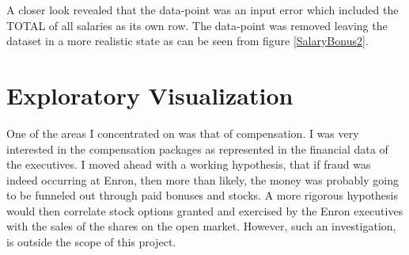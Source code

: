 \documentclass[titlepage,numbers=noenddot,headinclude,%
               footinclude=true,abstractoff,BCOR=5mm,%
               paper=a4,fontsize=11pt,ngerman,american]{scrreprt}
\numberwithin{theorem}{chapter}
\numberwithin{definition}{chapter}
\numberwithin{algorithm}{chapter}
\numberwithin{figure}{chapter}
\numberwithin{table}{chapter}
\numberwithin{equation}{chapter}
\begin{document}
 A closer look revealed that the data-point was an input error which included the TOTAL of all salaries as its own row. The data-point was removed leaving the dataset in a more realistic state as can be seen from figure \ref{SalaryBonus2}.




\section*{Exploratory Visualization}

One of the areas I concentrated on was that of compensation. I was very interested in the compensation packages as represented in the financial data of the executives. I moved ahead with a working hypothesis, that if fraud was indeed occurring at Enron, then more than likely, the money was probably going to be funneled out through paid bonuses and stocks. A more rigorous hypothesis would then correlate stock options granted and exercised by the Enron executives with the sales of the shares on the open market. However, such an investigation, is outside the scope of this project.
\end{document}
